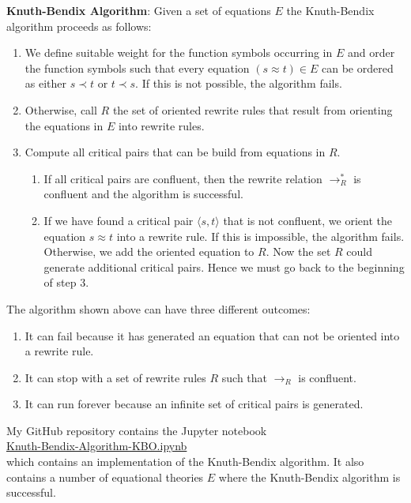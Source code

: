 \noindent
\textbf{Knuth-Bendix Algorithm}:  Given a set of equations $E$ the Knuth-Bendix algorithm proceeds as follows:
\begin{enumerate}
\item We define suitable weight for the function symbols occurring in $E$ and order the function symbols
      such that every equation  $(s \approx t) \in E$ can be ordered as either $s \prec t$ or $t \prec s$.
      If this is not possible, the algorithm fails.
\item Otherwise, call $R$ the set of oriented rewrite rules that result from orienting the equations in $E$
      into rewrite rules.
\item Compute all critical pairs that can be build from equations in $R$.
      \begin{enumerate}
      \item If all critical pairs are confluent, then the rewrite relation $\rightarrow^*_R$ is confluent
            and the algorithm is successful.
      \item If we have found a critical pair $\langle s, t \rangle$ that is not confluent,
            we orient the equation $s \approx t$ into a rewrite rule.  If this is impossible, the algorithm fails.
            Otherwise, we add the oriented equation to $R$.
            Now the set $R$ could generate additional critical pairs.
            Hence we must go back to the beginning of step 3. \eod
      \end{enumerate}
\end{enumerate}

\noindent
The algorithm shown above can have three different outcomes:
\begin{enumerate}
\item It can fail because it has generated an equation that can not be oriented into a rewrite rule.
\item It can stop with a set of rewrite rules $R$ such that $\rightarrow_R$ is confluent.
\item It can run forever because an infinite set of critical pairs is generated.
\end{enumerate} 
My GitHub repository contains the Jupyter notebook
\\[0.2cm]
\hspace*{1.3cm}
\href{https://github.com/karlstroetmann/Artificial-Intelligence/blob/master/Python/4%20Automatic%20Theorem%20Proving/Knuth-Bendix-Algorithm-KBO.ipynb}{Knuth-Bendix-Algorithm-KBO.ipynb}
\\[0.2cm]
which contains an implementation of the Knuth-Bendix algorithm.  It also contains a number of equational
theories $E$ where the Knuth-Bendix algorithm is successful.

